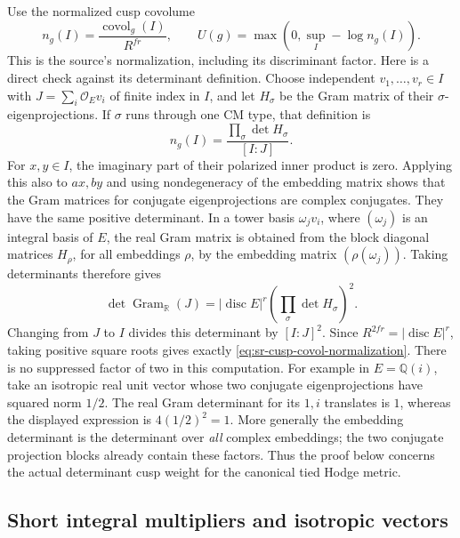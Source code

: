Use the normalized cusp covolume
\begin{equation}\label{eq:sr-cusp-covol-normalization}
                  n_g(I)=
                   \frac{\operatorname{covol}_g(I)}{R^{fr}},
 \qquad
 U(g)=\max\left(0,\sup_I-\log n_g(I)\right).
\end{equation}
This is the source's normalization, including its discriminant
factor.  Here is a direct check against its determinant definition.
Choose independent \(v_1,\dots,v_r\in I\) with
\(J=\sum_i\mathcal O_Ev_i\) of finite index in \(I\), and let
\(H_\sigma\) be the Gram matrix of their \(\sigma\)-eigenprojections.
If \(\sigma\) runs through one CM type, that definition is
\[
                     n_g(I)=
                   \frac{\prod_\sigma\det H_\sigma}{[I:J]} .
\]
For \(x,y\in I\), the imaginary part of their polarized inner
product is zero.  Applying this also to \(ax,by\) and using
nondegeneracy of the embedding matrix shows that the Gram matrices
for conjugate eigenprojections are complex conjugates.
They have the same positive determinant.
In a tower basis \(\omega_jv_i\), where \((\omega_j)\) is an
integral basis of \(E\), the real Gram matrix is obtained from the
block diagonal matrices \(H_\rho\), for all embeddings \(\rho\),
by the embedding matrix \((\rho(\omega_j))\).
Taking determinants therefore gives
\[
 \det\operatorname{Gram}_{\mathbb R}(J)
       =|\operatorname{disc}E|^r
                        \left(\prod_\sigma\det H_\sigma\right)^2 .
\]
Changing from \(J\) to \(I\) divides this determinant by
\([I:J]^2\).  Since
\(R^{2fr}=|\operatorname{disc}E|^r\), taking positive square roots
gives exactly \eqref{eq:sr-cusp-covol-normalization}.
There is no suppressed factor of two in this computation.
For example in \(E=\mathbb Q(i)\), take an isotropic real
unit vector whose two conjugate eigenprojections have squared
norm \(1/2\).  The real Gram determinant for its \(1,i\)
translates is \(1\), whereas the displayed expression is
\(4(1/2)^2=1\).  More generally the embedding determinant is
the determinant over \emph{all} complex embeddings; the two
conjugate projection blocks already contain these factors.
Thus the proof below concerns the actual determinant cusp weight
for the canonical tied Hodge metric.

\subsection{Short integral multipliers and isotropic vectors}

